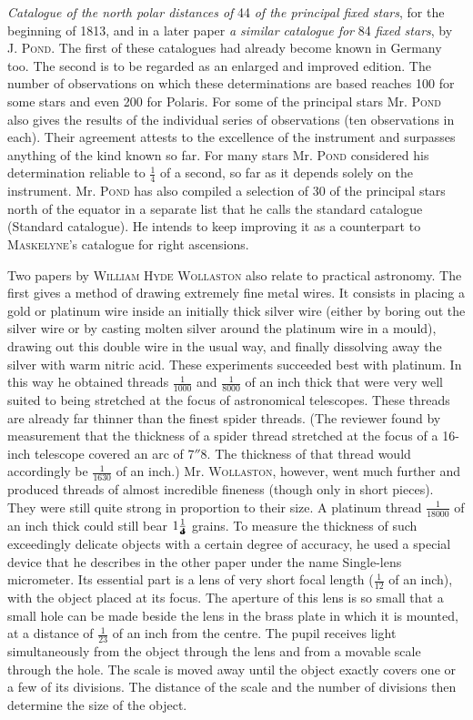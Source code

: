 \emph{Catalogue of the north polar distances of} 44 \emph{of the principal fixed stars}, for the beginning of 1813, and in a later paper \emph{a similar catalogue for} 84 \emph{fixed stars}, by J. \textsc{Pond}. The first of these catalogues had already become known in Germany too. The second is to be regarded as an enlarged and improved edition. The number of observations on which these determinations are based reaches 100 for some stars and even 200 for Polaris. For some of the principal stars Mr. \textsc{Pond} also gives the results of the individual series of observations (ten observations in each). Their agreement attests to the excellence of the instrument and surpasses anything of the kind known so far. For many stars Mr. \textsc{Pond} considered his determination reliable to $\frac{1}{4}$ of a second, so far as it depends solely on the instrument. Mr. \textsc{Pond} has also compiled a selection of 30 of the principal stars north of the equator in a separate list that he calls the standard catalogue (Standard catalogue). He intends to keep improving it as a counterpart to \textsc{Maskelyne}'s catalogue for right ascensions.

Two papers by \textsc{William Hyde Wollaston} also relate to practical astronomy. The first gives a method of drawing extremely fine metal wires. It consists in placing a gold or platinum wire inside an initially thick silver wire (either by boring out the silver wire or by casting molten silver around the platinum wire in a mould), drawing out this double wire in the usual way, and finally dissolving away the silver with warm nitric acid. These experiments succeeded best with platinum. In this way he obtained threads $\frac{1}{1000}$ and $\frac{1}{8000}$ of an inch thick that were very well suited to being stretched at the focus of astronomical telescopes. These threads are already far thinner than the finest spider threads. (The reviewer found by measurement that the thickness of a spider thread stretched at the focus of a 16-inch telescope covered an arc of $7''8$. The thickness of that thread would accordingly be $\frac{1}{1630}$ of an inch.) Mr. \textsc{Wollaston}, however, went much further and produced threads of almost incredible fineness (though only in short pieces). They were still quite strong in proportion to their size. A platinum thread $\frac{1}{18000}$ of an inch thick could still bear $1\frac{1}{\ObservedWollastonDenominator}$ grains. To measure the thickness of such exceedingly delicate objects with a certain degree of accuracy, he used a special device that he describes in the other paper under the name Single-lens micrometer. Its essential part is a lens of very short focal length ($\frac{1}{12}$ of an inch), with the object placed at its focus. The aperture of this lens is so small that a small hole can be made beside the lens in the brass plate in which it is mounted, at a distance of $\frac{1}{23}$ of an inch from the centre. The pupil receives light simultaneously from the object through the lens and from a movable scale through the hole. The scale is moved away until the object exactly covers one or a few of its divisions. The distance of the scale and the number of divisions then determine the size of the object.

